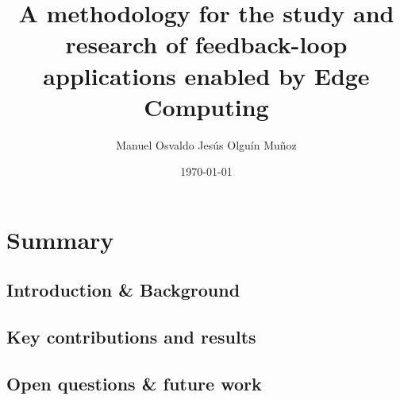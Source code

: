 \documentclass[electronic,oldfontcommands]{kthesis}
\begin{document}
\title{A methodology for the study and research of feedback-loop applications enabled by Edge Computing}
\subtitle{{}}
\author{Manuel {Osvaldo Jesús} {Olguín Muñoz}}
\date{\today}
\address{%
	KTH Royal Institute of Technology\\%
	School of Electrical Engineering and Computer Science\\%
	Division of Information Science and Engineering\\%
	SE-10044 Stockholm\\%
	Sweden%
}

\maketitle

\frontmatter %





\mainmatter %

\tableofcontents*{}

\part{Summary}\label{part:summary}
\chapter{Introduction \& Background}\label{chap:introduction}



\chapter{Key contributions and results}\label{chap:contributions}


\chapter{Open questions \& future work}

\end{document}
